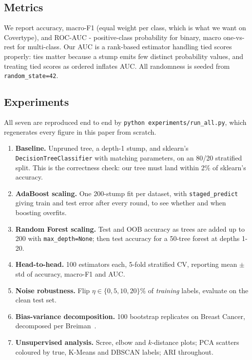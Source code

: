 \documentclass[conference]{IEEEtran}
\begin{document}
\subsection{Metrics}
We report accuracy, macro-F1 (equal weight per class, which is what we want
on Covertype), and ROC-AUC - positive-class probability for binary, macro
one-vs-rest for multi-class.  Our AUC is a rank-based estimator handling
tied scores properly: ties matter because a stump emits few distinct
probability values, and treating tied scores as ordered inflates AUC.  All
randomness is seeded from \texttt{random\_state=42}.

\subsection{Experiments}
All seven are reproduced end to end by \texttt{python experiments/run\_all.py},
which regenerates every figure in this paper from scratch.

\begin{enumerate}
  \item \textbf{Baseline.} Unpruned tree, a depth-1 stump, and sklearn's
        \texttt{DecisionTreeClassifier} with matching parameters, on an
        80/20 stratified split.  This is the correctness check: our tree
        must land within 2\% of sklearn's accuracy.
  \item \textbf{AdaBoost scaling.} One 200-stump fit per dataset, with
        \texttt{staged\_predict} giving train and test error after every
        round, to see whether and when boosting overfits.
  \item \textbf{Random Forest scaling.} Test and OOB accuracy as trees are
        added up to 200 with \texttt{max\_depth=None}; then test accuracy
        for a 50-tree forest at depths 1-20.
  \item \textbf{Head-to-head.} 100 estimators each, 5-fold stratified CV,
        reporting mean $\pm$ std of accuracy, macro-F1 and AUC.
  \item \textbf{Noise robustness.} Flip $\eta \in \{0, 5, 10, 20\}\%$ of
        \emph{training} labels, evaluate on the clean test set.
  \item \textbf{Bias-variance decomposition.} 100 bootstrap replicates on
        Breast Cancer, decomposed per Breiman~\cite{breiman1996bagging}.
  \item \textbf{Unsupervised analysis.} Scree, elbow and $k$-distance
        plots; PCA scatters coloured by true, K-Means and DBSCAN labels;
        ARI throughout.
\end{enumerate}
\end{document}

